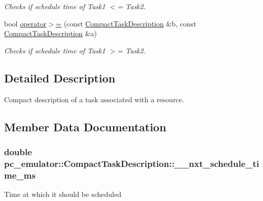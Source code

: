 \begin{DoxyCompactItemize}
\begin{DoxyCompactList}\small\item\em Checks if schedule time of Task1 $<$= Task2. \end{DoxyCompactList}\item 
bool \hyperlink{classpc__emulator_1_1CompactTaskDescription_acb7769d3e40857e929f5dc31f0eec602}{operator$>$=} (const \hyperlink{classpc__emulator_1_1CompactTaskDescription}{Compact\+Task\+Description} \&b, const \hyperlink{classpc__emulator_1_1CompactTaskDescription}{Compact\+Task\+Description} \&a)\hypertarget{classpc__emulator_1_1CompactTaskDescription_acb7769d3e40857e929f5dc31f0eec602}{}\label{classpc__emulator_1_1CompactTaskDescription_acb7769d3e40857e929f5dc31f0eec602}

\begin{DoxyCompactList}\small\item\em Checks if schedule time of Task1 $>$= Task2. \end{DoxyCompactList}\end{DoxyCompactItemize}


\subsection{Detailed Description}
Compact description of a task associated with a resource. 

\subsection{Member Data Documentation}
\subsubsection[{\texorpdfstring{\+\_\+\+\_\+nxt\+\_\+schedule\+\_\+time\+\_\+ms}{__nxt_schedule_time_ms}}]{\setlength{\rightskip}{0pt plus 5cm}double pc\+\_\+emulator\+::\+Compact\+Task\+Description\+::\+\_\+\+\_\+nxt\+\_\+schedule\+\_\+time\+\_\+ms}\hypertarget{classpc__emulator_1_1CompactTaskDescription_a48bc5f3d160ff382cc8aa3c3cf22c318}{}\label{classpc__emulator_1_1CompactTaskDescription_a48bc5f3d160ff382cc8aa3c3cf22c318}
Time at which it should be scheduled 
